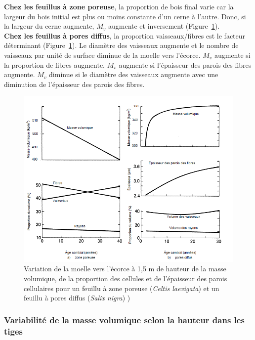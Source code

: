\textbf{Chez les feuillus à zone poreuse}, la proportion de bois final varie car la largeur du bois initial est plus ou moins constante d'un cerne à l'autre. Donc, si la largeur du cerne augmente, $M_v$ augmente et inversement (Figure~\ref{fig:densite_moelle_feuillus}).\\

\textbf{Chez les feuillus à pores diffus}, la proportion vaisseaux/fibres est le facteur déterminant (Figure~\ref{fig:densite_moelle_feuillus}). Le diamètre des vaisseaux augmente et le nombre de vaisseaux par unité de surface diminue de la moelle vers l'écorce. $M_v$ augmente si la proportion de fibres augmente. $M_v$ augmente si l'épaisseur des parois des fibres augmente. $M_v$ diminue si le diamètre des vaisseaux augmente avec une diminution de l'épaisseur des parois des fibres.

\begin{figure}[h]
	\centering
	\includegraphics[scale=0.55]{img/ch7_densite_moelle_feuillus}
	\caption{Variation de la moelle vers l'écorce à 1,5 m de hauteur de la masse volumique, de la proportion des cellules et de l'épaisseur des parois cellulaires pour un feuillu à zone poreuse (\textit{Celtis laevigata}) et un feuillu à pores diffus (\textit{Salix nigra}) \cite{panshin1980textbook})}
	\label{fig:densite_moelle_feuillus}
\end{figure}


\subsubsection{Variabilité de la masse volumique selon la hauteur dans les tiges}

